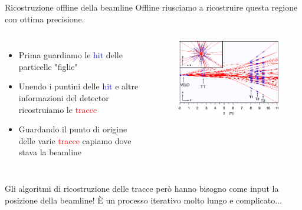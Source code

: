 \documentclass[
10pt,
aspectratio=169,
]{beamer}
\begin{document}
\begin{frame}{Ricostruzione offline della beamline}
    Offline riusciamo a ricostruire questa regione con ottima precisione. 
    \begin{columns}
    \begin{itemize}
        \item Prima guardiamo le \textcolor{blue}{hit} delle particelle "figlie"
        \item Unendo i puntini delle \textcolor{blue}{hit} e altre informazioni del detector ricostruiamo le \textcolor{red}{tracce}
        \item Guardando il punto di origine delle varie \textcolor{red}{tracce} capiamo dove stava la beamline
    \end{itemize}

    \begin{figure}
        \centering
        \includegraphics[width=\textwidth]{figures/lots_of_tracks.png}
    \end{figure}
        \end{columns}
Gli algoritmi di ricostruzione delle tracce però hanno bisogno come input la posizione della beamline!
È un processo iterativo molto lungo e complicato...
\end{frame}
\end{document}

